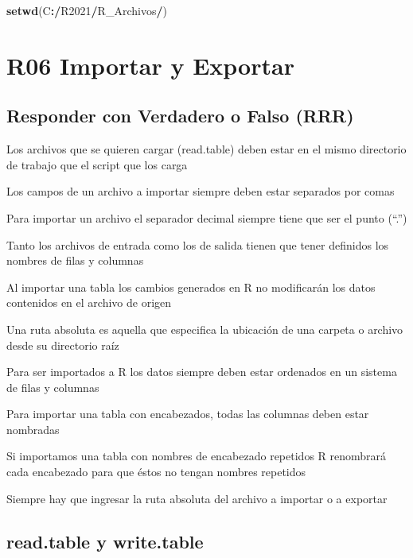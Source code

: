 \documentclass[]{book}
\newenvironment{Shaded}{\begin{snugshade}}{\end{snugshade}}
\newcommand{\ErrorTok}[1]{\textcolor[rgb]{0.64,0.00,0.00}{\textbf{#1}}}
\newcommand{\KeywordTok}[1]{\textcolor[rgb]{0.13,0.29,0.53}{\textbf{#1}}}
\newcommand{\NormalTok}[1]{#1}
\newcommand{\OperatorTok}[1]{\textcolor[rgb]{0.81,0.36,0.00}{\textbf{#1}}}
\begin{document}
\begin{Shaded}
\begin{Highlighting}[]
\KeywordTok{setwd}\NormalTok{(C}\OperatorTok{:}\ErrorTok{/}\NormalTok{R2021}\OperatorTok{/}\NormalTok{R_Archivos}\OperatorTok{/}\NormalTok{)}
\end{Highlighting}
\end{Shaded}

\hypertarget{r06-importar-y-exportar}{%
\chapter*{R06 Importar y Exportar}\label{r06-importar-y-exportar}}

\hypertarget{responder-con-verdadero-o-falso-rrr-1}{%
\section{Responder con Verdadero o Falso (RRR)}\label{responder-con-verdadero-o-falso-rrr-1}}

Los archivos que se quieren cargar (read.table) deben estar en el mismo directorio de trabajo que el script que los carga

Los campos de un archivo a importar siempre deben estar separados por comas

Para importar un archivo el separador decimal siempre tiene que ser el punto (``.'')

Tanto los archivos de entrada como los de salida tienen que tener definidos los nombres de filas y columnas

Al importar una tabla los cambios generados en R no modificarán los datos contenidos en el archivo de origen

Una ruta absoluta es aquella que especifica la ubicación de una carpeta o archivo desde su directorio raíz

Para ser importados a R los datos siempre deben estar ordenados en un sistema de filas y columnas

Para importar una tabla con encabezados, todas las columnas deben estar nombradas

Si importamos una tabla con nombres de encabezado repetidos R renombrará cada encabezado para que éstos no tengan nombres repetidos

Siempre hay que ingresar la ruta absoluta del archivo a importar o a exportar

\hypertarget{read.table-y-write.table}{%
\section{read.table y write.table}\label{read.table-y-write.table}}
\end{document}
